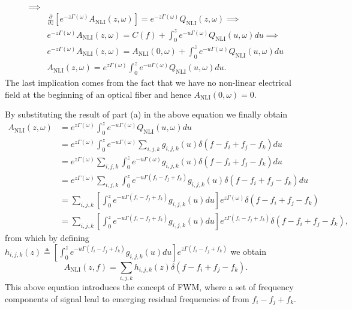 \documentclass[10pt,letterpaper]{article}
\begin{document}
\begin{enumerate}[label=\alph*-]
\[\begin{split}
\implies\\&
\frac{\partial}{\partial z}\left[e^{-z\Gamma(\omega)}A_\text{NLI}(z,\omega)\right]
=e^{-z\Gamma(\omega)}Q_\text{NLI}(z,\omega)
\implies
\\&
e^{-z\Gamma(\omega)}A_\text{NLI}(z,\omega)=
C(f)+
\int_0^z e^{-u\Gamma(\omega)}Q_\text{NLI}(u,\omega)du
\implies
\\&
e^{-z\Gamma(\omega)}A_\text{NLI}(z,\omega)=
A_\text{NLI}(0,\omega)+
\int_0^z e^{-u\Gamma(\omega)}Q_\text{NLI}(u,\omega)du
\\&
A_\text{NLI}(z,\omega)=
e^{z\Gamma(\omega)}\int_0^z e^{-u\Gamma(\omega)}Q_\text{NLI}(u,\omega)du
.
\end{split}\]
The last implication comes from the fact that we have no non-linear electrical field at the beginning of an optical fiber and hence $A_\text{NLI}(0,\omega)=0$.

By substituting the result of part (a) in the above equation we finally obtain
\[\begin{split}
A_\text{NLI}(z,\omega)&=
e^{z\Gamma(\omega)}\int_0^z e^{-u\Gamma(\omega)}Q_\text{NLI}(u,\omega)du
\\&=
e^{z\Gamma(\omega)}\int_0^z e^{-u\Gamma(\omega)}\sum_{i,j,k} g_{i,j,k}(u)\delta(f-f_i+f_j-f_k)du
\\&=
e^{z\Gamma(\omega)}
\sum_{i,j,k}
\int_0^z e^{-u\Gamma(\omega)}g_{i,j,k}(u)\delta(f-f_i+f_j-f_k)du
\\&=
e^{z\Gamma(\omega)}
\sum_{i,j,k}
\int_0^z e^{-u\Gamma(f_i-f_j+f_k)}g_{i,j,k}(u)\delta(f-f_i+f_j-f_k)du
\\&=
\sum_{i,j,k}
\left[\int_0^z e^{-u\Gamma(f_i-f_j+f_k)}g_{i,j,k}(u)du\right]
e^{z\Gamma(\omega)}\delta(f-f_i+f_j-f_k)
\\&=
\sum_{i,j,k}
\left[\int_0^z e^{-u\Gamma(f_i-f_j+f_k)}g_{i,j,k}(u)du\right]
e^{z\Gamma(f_i-f_j+f_k)}\delta(f-f_i+f_j-f_k),
\end{split}\]
from which by defining $h_{i,j,k}(z)\triangleq \left[\int_0^z e^{-u\Gamma(f_i-f_j+f_k)}g_{i,j,k}(u)du\right]
e^{z\Gamma(f_i-f_j+f_k)}$ we obtain
$$
A_\text{NLI}(z,f)=\sum_{i,j,k} h_{i,j,k}(z)\delta(f-f_i+f_j-f_k)
.
$$
This above equation introduces the concept of FWM, where a set of frequency components of signal lead to emerging residual frequencies of from $f_i-f_j+f_k$.
\end{enumerate}
\end{document}
